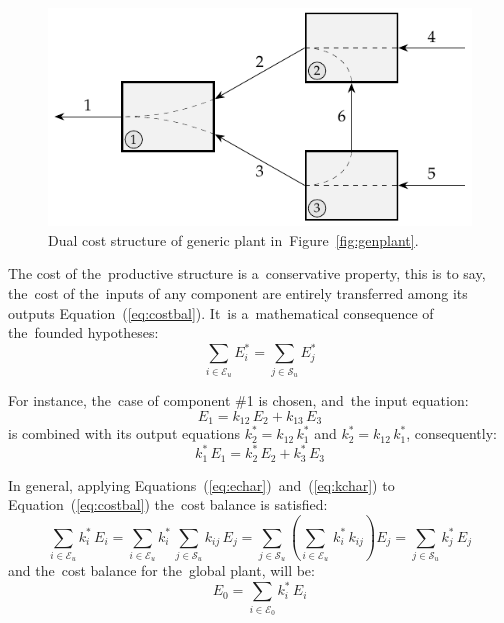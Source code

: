 \documentclass[energies,article,accept,moreauthors,pdftex]{Definitions/mdpi}
\begin{document}
\begin{figure}[H]
    \centering
    \includegraphics{genplantr}
    \caption{Dual cost structure of generic plant in~Figure~\ref{fig:genplant}.}
    \label{fig:genplantr}
\end{figure}

The cost of the~productive structure is a~conservative property, this is to say, the~cost of the~inputs of any component are entirely transferred among its outputs Equation~(\ref{eq:costbal}). It~is a~mathematical consequence of the~founded hypotheses:
\begin{equation}
    \sum_{i\in\mathcal{E}_u}{E_i^*}=\sum_{j\in\mathcal{S}_u}{E_j^*}
    \label{eq:costbal}
\end{equation}

For instance, the~case of component \#1 is chosen, and~the input equation:
\[
E_1=k_{12}\,E_2+k_{13}\,E_3
\]
is combined with its output equations $k_2^*=k_{12}\,k_1^*$ and $k_2^*=k_{12}\,k_1^*$, consequently:
\[
 k_1^*\,E_1 = k_2^*\,E_2+k_3^*\,E_3
\]

In general, applying Equations~(\ref{eq:echar})~and~(\ref{eq:kchar}) to Equation~(\ref{eq:costbal}) the~cost balance is satisfied:
\begin{equation}
    \sum_{i\in\mathcal{E}_u}{k_i^*\,E_i}=\sum_{i\in\mathcal{E}_u}{k_i^*\,\sum_{j\in\mathcal{S}_u}{k_{ij}\,E_j}}=\sum_{j\in\mathcal{S}_u}{\left(\sum_{i\in\mathcal{E}_u}\,k_i^*\,k_{ij}\right)E_j}=\sum_{j\in\mathcal{S}_u}{k_j^*\,E_j}
\end{equation}
and the~cost balance for the~global plant, will be:
\begin{equation}
    E_0=\sum_{i\in\mathcal{E}_0}{k_i^*\,E_i}
\end{equation}
\end{document}
